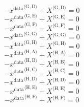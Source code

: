 \begin{equation}
-{x^{\mathrm{data}}}^{\langle \mathrm{\mathrm{G}},\mathrm{\mathrm{D}}\rangle} + {X}^{\langle \mathrm{G},\mathrm{D}\rangle} = 0
\end{equation}
\begin{equation}
-{x^{\mathrm{data}}}^{\langle \mathrm{\mathrm{G}},\mathrm{\mathrm{E}}\rangle} + {X}^{\langle \mathrm{G},\mathrm{E}\rangle} = 0
\end{equation}
\begin{equation}
-{x^{\mathrm{data}}}^{\langle \mathrm{\mathrm{G}},\mathrm{\mathrm{F}}\rangle} + {X}^{\langle \mathrm{G},\mathrm{F}\rangle} = 0
\end{equation}
\begin{equation}
-{x^{\mathrm{data}}}^{\langle \mathrm{\mathrm{G}},\mathrm{\mathrm{G}}\rangle} + {X}^{\langle \mathrm{G},\mathrm{G}\rangle} = 0
\end{equation}
\begin{equation}
-{x^{\mathrm{data}}}^{\langle \mathrm{\mathrm{G}},\mathrm{\mathrm{H}}\rangle} + {X}^{\langle \mathrm{G},\mathrm{H}\rangle} = 0
\end{equation}
\begin{equation}
-{x^{\mathrm{data}}}^{\langle \mathrm{\mathrm{H}},\mathrm{\mathrm{A}}\rangle} + {X}^{\langle \mathrm{H},\mathrm{A}\rangle} = 0
\end{equation}
\begin{equation}
-{x^{\mathrm{data}}}^{\langle \mathrm{\mathrm{H}},\mathrm{\mathrm{B}}\rangle} + {X}^{\langle \mathrm{H},\mathrm{B}\rangle} = 0
\end{equation}
\begin{equation}
-{x^{\mathrm{data}}}^{\langle \mathrm{\mathrm{H}},\mathrm{\mathrm{C}}\rangle} + {X}^{\langle \mathrm{H},\mathrm{C}\rangle} = 0
\end{equation}
\begin{equation}
-{x^{\mathrm{data}}}^{\langle \mathrm{\mathrm{H}},\mathrm{\mathrm{D}}\rangle} + {X}^{\langle \mathrm{H},\mathrm{D}\rangle} = 0
\end{equation}
\begin{equation}
-{x^{\mathrm{data}}}^{\langle \mathrm{\mathrm{H}},\mathrm{\mathrm{E}}\rangle} + {X}^{\langle \mathrm{H},\mathrm{E}\rangle} = 0
\end{equation}
\begin{equation}
-{x^{\mathrm{data}}}^{\langle \mathrm{\mathrm{H}},\mathrm{\mathrm{F}}\rangle} + {X}^{\langle \mathrm{H},\mathrm{F}\rangle} = 0
\end{equation}
